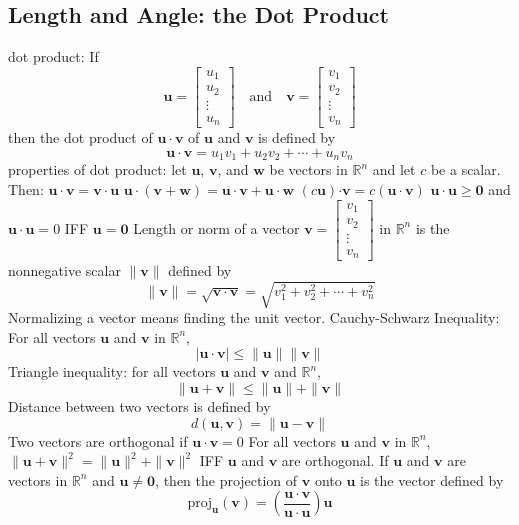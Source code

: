 \documentclass{article}
\begin{document}
        \subsection{Length and Angle: the Dot Product}
        \begin{outline}
            \1 dot product: If \[\mathbf u=\begin{bmatrix}u_1\\u_2\\\vdots\\u_n\end{bmatrix}\quad\text{and}\quad\mathbf v=\begin{bmatrix}v_1\\v_2\\\vdots\\v_n\end{bmatrix}\] then the dot product of \(\mathbf u\cdot\mathbf v\) of \(\mathbf u\) and \(\mathbf v\) is defined by \[\mathbf u\cdot\mathbf v=u_1v_1+u_2v_2+\cdots+u_nv_n\]
            \1 properties of dot product: let \(\mathbf u\), \(\mathbf v\), and \(\mathbf w\) be vectors in \(\mathbb R^n\) and let $c$ be a scalar. Then: 
                \2 \(\mathbf{u\cdot v}=\mathbf{v\cdot u}\)
                \2 \(\mathbf{u\cdot}(\mathbf{v+w})=\mathbf{u\cdot v+u\cdot w}\)
                \2 \((c\mathbf u)\mathbf{\cdot v}=c(\mathbf{u\cdot v})\)
                \2 \(\mathbf{u\cdot u\geq 0}\) and \(\mathbf{u\cdot u}=0\) IFF \(\mathbf u=\mathbf 0\)
                \2 Length or norm of a vector \(\mathbf v=\begin{bmatrix}v_1\\v_2\\\vdots\\v_n\end{bmatrix}\) in \(\mathbb R^n\) is the nonnegative scalar \(\|\mathbf v\|\) defined by \[\|\mathbf v\|=\sqrt{\mathbf{v\cdot v}}=\sqrt{v_1^2+v_2^2+\cdots+v_n^2}\]
            \1 Normalizing a vector means finding the unit vector. 
            \1 Cauchy-Schwarz Inequality: For all vectors \(\mathbf u\) and \(\mathbf v\) in \(\mathbb R^n\), \[|\mathbf{u\cdot v}|\leq \|\mathbf u\|\|\mathbf v\|\]
            \1 Triangle inequality: for all vectors \(\mathbf u\) and \(\mathbf v\) and \(\mathbb R^n\), \[\|\mathbf u+\mathbf v\|\leq\|\mathbf u\|+\|\mathbf v\|\]
            \1 Distance between two vectors is defined by \[d(\mathbf u,\mathbf v)=\|\mathbf u-\mathbf v\|\]
            \1 Two vectors are orthogonal if \(\mathbf u\cdot\mathbf v=0\)
            \1 For all vectors \(\mathbf u\) and \(\mathbf v\) in \(\mathbb R^n\), \(\|\mathbf u+\mathbf v\|^2=\|\mathbf u\|^2+\|\mathbf v\|^2\) IFF \(\mathbf u\) and \(\mathbf v\) are orthogonal. 
            \1 If \(\mathbf u\) and \(\mathbf v\) are vectors in \(\mathbb R^n\) and \(\mathbf u\neq\mathbf 0\), then the projection of \(\mathbf v\) onto \(\mathbf u\) is the vector defined by \[\text{proj}_{\mathbf u}(\mathbf v)=\left(\dfrac{\mathbf{u\cdot v}}{\mathbf{u\cdot u}}\right)\mathbf u\]

        \end{outline}
\end{document}
